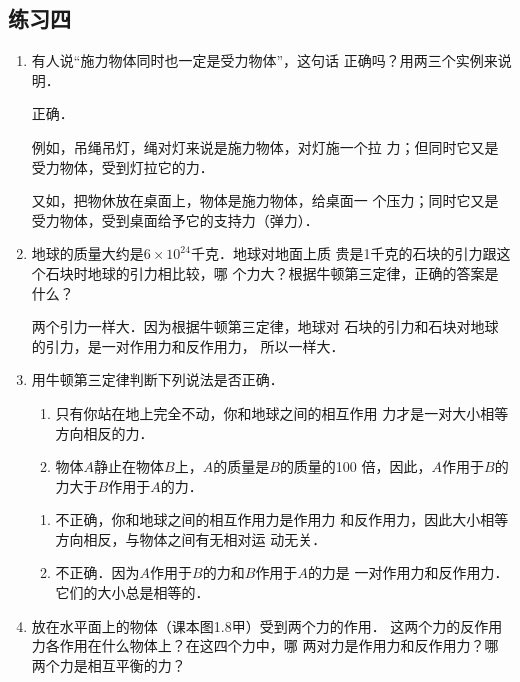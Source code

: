 \subsection{练习四}
\begin{enumerate}
\item  有人说“施力物体同时也一定是受力物体”，这句话
正确吗？用两三个实例来说明．

\begin{solution}
    正确．

    例如，吊绳吊灯，绳对灯来说是施力物体，对灯施一个拉
    力；但同时它又是受力物体，受到灯拉它的力．

    又如，把物休放在桌面上，物体是施力物体，给桌面一
    个压力；同时它又是受力物体，受到桌面给予它的支持力（弹力）．
\end{solution}
\item  地球的质量大约是$6\times 10^{24}$千克．地球对地面上质
贵是1千克的石块的引力跟这个石块时地球的引力相比较，哪
个力大？根据牛顿第三定律，正确的答案是什么？

\begin{solution}
    两个引力一样大．因为根据牛顿第三定律，地球对
    石块的引力和石块对地球的引力，是一对作用力和反作用力，
    所以一样大．
\end{solution}

\item  用牛顿第三定律判断下列说法是否正确．
\begin{enumerate}
\item  只有你站在地上完全不动，你和地球之间的相互作用
力才是一对大小相等方向相反的力．
\item  物体$A$静止在物体$B$上，$A$的质量是$B$的质量的100
倍，因此，$A$作用于$B$的力大于$B$作用于$A$的力．
\end{enumerate}


\begin{solution}
\begin{enumerate}
    \item 不正确，你和地球之间的相互作用力是作用力
    和反作用力，因此大小相等方向相反，与物体之间有无相对运
    动无关．
    \item 不正确．因为$A$作用于$B$的力和$B$作用于$A$的力是
    一对作用力和反作用力．它们的大小总是相等的．
\end{enumerate}
\end{solution}
\item  放在水平面上的物体（课本图1.8甲）受到两个力的作用．
这两个力的反作用力各作用在什么物体上？在这四个力中，哪
两对力是作用力和反作用力？哪两个力是相互平衡的力？


\end{enumerate}
